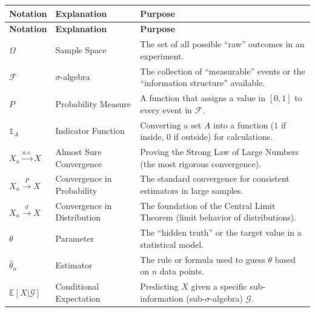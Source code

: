 \begin{longtable}{ | L{0.15\textwidth} | L{0.45\textwidth} | L{0.25\textwidth} | }
    \hline
    \textbf{Notation} & \textbf{Explanation} & \textbf{Purpose} \\
    \hline
    \endfirsthead

    \hline
    \textbf{Notation} & \textbf{Explanation} & \textbf{Purpose} \\
    \hline
    \endhead

    \hline
    \endfoot

    \hline
    \endlastfoot

    $\Omega$ 
    & Sample Space 
    & The set of all possible ``raw'' outcomes in an experiment. \\ \hline

    $\mathcal{F}$ 
    & $\sigma$-algebra 
    & The collection of ``measurable'' events or the ``information structure'' available. \\ \hline

    $P$ 
    & Probability Measure 
    & A function that assigns a value in $[0,1]$ to every event in $\mathcal{F}$. \\ \hline

    $\mathbb{1}_A$ 
    & Indicator Function 
    & Converting a set $A$ into a function ($1$ if inside, $0$ if outside) for calculations. \\ \hline

    $X_n \xrightarrow{a.s.} X$ 
    & Almost Sure Convergence 
    & Proving the Strong Law of Large Numbers (the most rigorous convergence). \\ \hline

    $X_n \xrightarrow{P} X$ 
    & Convergence in Probability 
    & The standard convergence for consistent estimators in large samples. \\ \hline

    $X_n \xrightarrow{d} X$ 
    & Convergence in Distribution 
    & The foundation of the Central Limit Theorem (limit behavior of distributions). \\ \hline

    $\theta$ 
    & Parameter 
    & The ``hidden truth'' or the target value in a statistical model. \\ \hline

    $\hat{\theta}_n$ 
    & Estimator 
    & The rule or formula used to guess $\theta$ based on $n$ data points. \\ \hline

    $\mathbb{E}[X|\mathcal{G}]$ 
    & Conditional Expectation 
    & Predicting $X$ given a specific sub-information (sub-$\sigma$-algebra) $\mathcal{G}$. \\ \hline

\end{longtable}